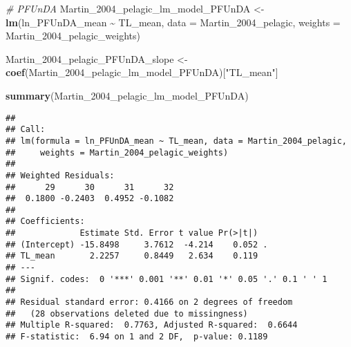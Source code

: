 \documentclass[
]{article}
\newenvironment{Shaded}{\begin{snugshade}}{\end{snugshade}}
\newcommand{\AttributeTok}[1]{\textcolor[rgb]{0.13,0.29,0.53}{#1}}
\newcommand{\CommentTok}[1]{\textcolor[rgb]{0.56,0.35,0.01}{\textit{#1}}}
\newcommand{\FunctionTok}[1]{\textcolor[rgb]{0.13,0.29,0.53}{\textbf{#1}}}
\newcommand{\NormalTok}[1]{#1}
\newcommand{\OtherTok}[1]{\textcolor[rgb]{0.56,0.35,0.01}{#1}}
\newcommand{\SpecialCharTok}[1]{\textcolor[rgb]{0.81,0.36,0.00}{\textbf{#1}}}
\newcommand{\StringTok}[1]{\textcolor[rgb]{0.31,0.60,0.02}{#1}}
\begin{document}
\begin{Shaded}
\begin{Highlighting}[]
\CommentTok{\# PFUnDA}
\NormalTok{Martin\_2004\_pelagic\_lm\_model\_PFUnDA }\OtherTok{\textless{}{-}} \FunctionTok{lm}\NormalTok{(ln\_PFUnDA\_mean }\SpecialCharTok{\textasciitilde{}}\NormalTok{ TL\_mean, }
                                        \AttributeTok{data =}\NormalTok{ Martin\_2004\_pelagic,}
                                        \AttributeTok{weights =}\NormalTok{ Martin\_2004\_pelagic\_weights)}

\NormalTok{Martin\_2004\_pelagic\_PFUnDA\_slope }\OtherTok{\textless{}{-}} \FunctionTok{coef}\NormalTok{(Martin\_2004\_pelagic\_lm\_model\_PFUnDA)[}\StringTok{"TL\_mean"}\NormalTok{]}

\FunctionTok{summary}\NormalTok{(Martin\_2004\_pelagic\_lm\_model\_PFUnDA)}
\end{Highlighting}
\end{Shaded}

\begin{verbatim}
## 
## Call:
## lm(formula = ln_PFUnDA_mean ~ TL_mean, data = Martin_2004_pelagic, 
##     weights = Martin_2004_pelagic_weights)
## 
## Weighted Residuals:
##      29      30      31      32 
##  0.1800 -0.2403  0.4952 -0.1082 
## 
## Coefficients:
##             Estimate Std. Error t value Pr(>|t|)  
## (Intercept) -15.8498     3.7612  -4.214    0.052 .
## TL_mean       2.2257     0.8449   2.634    0.119  
## ---
## Signif. codes:  0 '***' 0.001 '**' 0.01 '*' 0.05 '.' 0.1 ' ' 1
## 
## Residual standard error: 0.4166 on 2 degrees of freedom
##   (28 observations deleted due to missingness)
## Multiple R-squared:  0.7763, Adjusted R-squared:  0.6644 
## F-statistic:  6.94 on 1 and 2 DF,  p-value: 0.1189
\end{verbatim}
\end{document}
